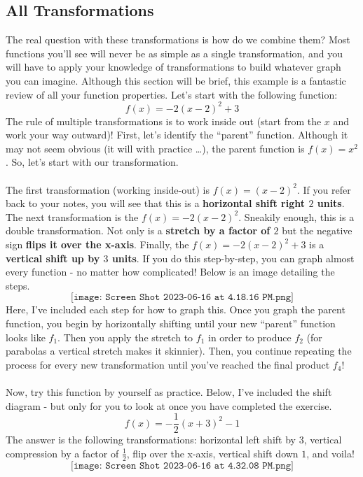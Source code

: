 \subsection{All Transformations}
The real question with these transformations is how do we combine them? Most functions you'll see will never be as simple as a single transformation, and you will have to apply your knowledge of transformations to build whatever graph you can imagine. Although this section will be brief, this example is a fantastic review of all your function properties. Let's start with the following function:
$$
f(x) = -2(x-2)^2 + 3
$$
The rule of multiple transformations is to work inside out (start from the $x$ and work your way outward)! First, let's identify the ``parent'' function. Although it may not seem obvious (it will with practice \dots), the parent function is $f(x) = x^2$. So, let's start with our transformation.\\
\\
The first transformation (working inside-out) is $f(x) = (x-2)^2$. If you refer back to your notes, you will see that this is a \textbf{horizontal shift right $2$ units}. The next transformation is the $f(x) = -2(x-2)^2$. Sneakily enough, this is a double transformation. Not only is a \textbf{stretch by a factor of $2$} but the negative sign \textbf{flips it over the x-axis}. Finally, the $f(x) = -2(x-2)^2 + 3$ is a \textbf{vertical shift up by $3$ units}. If you do this step-by-step, you can graph almost every function - no matter how complicated! Below is an image detailing the steps.
$$
\texttt{[image: Screen Shot 2023-06-16 at 4.18.16 PM.png]}
$$
Here, I've included each step for how to graph this. Once you graph the parent function, you begin by horizontally shifting until your new ``parent'' function looks like $f_1$. Then you apply the stretch to $f_1$ in order to produce $f_2$ (for parabolas a vertical stretch makes it skinnier). Then, you continue repeating the process for every new transformation until you've reached the final product $f_4$! \\
\\
Now, try this function by yourself as practice. Below, I've included the shift diagram - but only for you to look at once you have completed the exercise.
$$
f(x) = -\frac{1}{2}(x+3)^2 - 1
$$
The answer is the following transformations: horizontal left shift by $3$, vertical compression by a factor of $\frac{1}{2}$, flip over the x-axis, vertical shift down $1$, and voila!
$$
\texttt{[image: Screen Shot 2023-06-16 at 4.32.08 PM.png]}
$$
